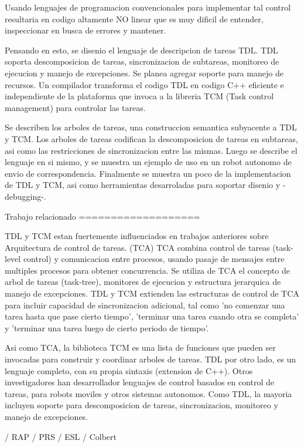 Usando lenguajes de programacion convencionales para implementar tal control resultaria en codigo altamente NO linear que es muy 
dificil de entender, inspeccionar en busca de errores y mantener.

Pensando en esto, se disenio el lenguaje de descripcion de tareas TDL.
TDL soporta descomposicion de tareas, sincronizacion de subtareas, monitoreo de ejecucion y manejo de excepciones.
Se planea agregar soporte para manejo de recursos.
Un compilador transforma el codigo TDL en codigo C++ eficiente e independiente de la plataforma que invoca a la libreria TCM (Task control management)
para controlar las tareas.

Se describen los arboles de tareas, una construccion semantica subyacente a TDL y TCM. 
Los arboles de tareas codifican la descomposicion de tareas en subtareas, asi como las restricciones de sincronizacion entre las mismas.
Luego se describe el lenguaje en si mismo, y se muestra un ejemplo de uso en un robot autonomo de envio de correspondencia.
Finalmente se muestra un poco de la implementacion de TDL y TCM, asi como herramientas desarroladas para soportar disenio y -debugging-.


Trabajo relacionado
===================

TDL y TCM estan fuertemente influenciados en trabajos anteriores sobre Arquitectura de control de tareas. (TCA)
TCA combina control de tareas (task-level control) y comunicacion entre procesos, usando pasaje de mensajes entre multiples procesos
para obtener concurrencia. 
Se utiliza de TCA el concepto de arbol de tareas (task-tree), monitores de ejecucion y estructura jerarquica de manejo de excepciones.
TDL y TCM extienden las estructuras de control de TCA para incluir capacidad de sincronizacion adicional, tal como 'no comenzar una tarea hasta 
que pase cierto tiempo', 'terminar una tarea cuando otra se completa' y 'terminar una tarea luego de cierto periodo de tiempo'.

Asi como TCA, la biblioteca TCM es una lista de funciones que pueden ser invocadas para construir y coordinar arboles de tareas.
TDL por otro lado, es un lenguaje completo, con su propia sintaxis (extension de C++).
Otros investigadores han desarrollador lenguajes de control basados en control de tareas, para robots moviles y otros sistemas autonomos.
Como TDL, la mayoria incluyen soporte para descomposicion de tareas, sincronizacion, monitoreo y manejo de excepciones.

/ RAP
/ PRS
/ ESL
/ Colbert

